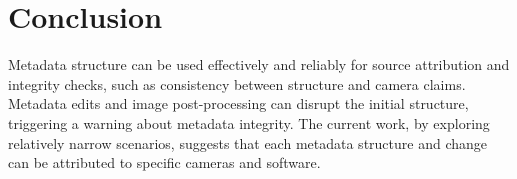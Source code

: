 \section{Conclusion}
Metadata structure can be used effectively and reliably for source attribution and integrity checks, such as consistency between structure and camera claims. Metadata edits and image post-processing can disrupt the initial structure, triggering a warning about metadata integrity. The current work, by exploring relatively narrow scenarios, suggests that each metadata structure and change can be attributed to specific cameras and software.